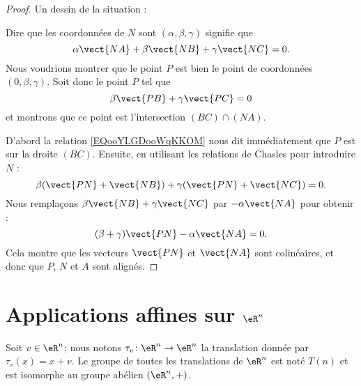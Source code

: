 \begin{proof}
    Un dessin de la situation :

    \begin{center}
        
    \end{center}

    Dire que les coordonnées de \( N\) sont \( (\alpha,\beta,\gamma)\) signifie que
    \begin{equation}
        \alpha\vect{ NA }+\beta\vect{ NB }+\gamma\vect{ NC }=0.
    \end{equation}
    Nous voudrions montrer que le point \( P\) est bien le point de coordonnées \( (0,\beta,\gamma)\). Soit donc le point \( P\) tel que
    \begin{equation}        \label{EQooYLGDooWqKKOM}
        \beta\vect{ PB }+\gamma\vect{ PC }=0
    \end{equation}
    et montrons que ce point est l'intersection \( (BC)\cap (NA)\).

    D'abord la relation \eqref{EQooYLGDooWqKKOM} nous dit immédiatement que \( P\) est sur la droite \( (BC)\). Ensuite, en utilisant les relations de Chasles pour introduire \( N\) :
    \begin{equation}
        \beta(\vect{ PN }+\vect{ NB })+\gamma(\vect{ PN }+\vect{ NC })=0.
    \end{equation}
    Nous remplaçons \( \beta\vect{ NB }+\gamma\vect{ NC }\) par \( -\alpha\vect{ NA }\) pour obtenir :
    \begin{equation}
        (\beta+\gamma)\vect{ PN }-\alpha\vect{ NA }=0.
    \end{equation}
    Cela montre que les vecteurs \( \vect{ PN }\) et \( \vect{ NA }\) sont colinéaires, et donc que \( P\), \( N\) et \( A\) sont alignés.
\end{proof}

\section{Applications affines sur \( \eR^n\)}

Soit \( v\in \eR^n\); nous notons \( \tau_v\colon \eR^n\to \eR^n\) la translation donnée par \( \tau_v(x)=x+v\). Le groupe de toutes les translations de \( \eR^n\) est noté \( T(n)\) et est isomorphe au groupe abélien \( (\eR^n,+)\).

